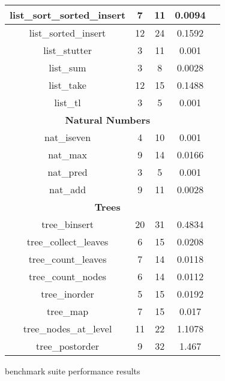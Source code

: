 \begin{figure}
\begin{center}
\begin{tabular}{|c|c|c|c|c|}
list\_sort\_sorted\_insert & 7 & 11 & 0.0094 \\
\hline
list\_sorted\_insert & 12 & 24 & 0.1592 \\
\hline
list\_stutter & 3 & 11 & 0.001 \\
\hline
list\_sum & 3 & 8 & 0.0028 \\
\hline
list\_take & 12 & 15 & 0.1488 \\
\hline
list\_tl & 3 & 5 & 0.001 \\
\hline
\multicolumn{4}{|c|}{\textbf{Natural Numbers}} \\
\hline
nat\_iseven & 4 & 10 & 0.001 \\
\hline
nat\_max & 9 & 14 & 0.0166 \\
\hline
nat\_pred & 3 & 5 & 0.001 \\
\hline
nat\_add & 9 & 11 & 0.0028 \\
\hline
\multicolumn{4}{|c|}{\textbf{Trees}} \\
\hline
tree\_binsert & 20 & 31 & 0.4834 \\
\hline
tree\_collect\_leaves & 6 & 15 & 0.0208 \\
\hline
tree\_count\_leaves & 7 & 14 & 0.0118 \\
\hline
tree\_count\_nodes & 6 & 14 & 0.0112 \\
\hline
tree\_inorder & 5 & 15 & 0.0192 \\
\hline
tree\_map & 7 & 15 & 0.017 \\
\hline
tree\_nodes\_at\_level & 11 & 22 & 1.1078 \\
\hline
tree\_postorder & 9 & 32 & 1.467 \\

  \hline
  \end{tabular}
  \end{center}
  \caption{\myth{} benchmark suite performance results}
  \label{fig:myth-raw-benchmarks}
\end{figure}

